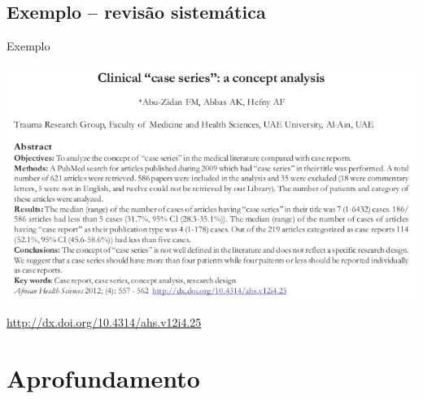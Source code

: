 \documentclass{beamer}
\begin{document}

\subsection{Exemplo -- revisão sistemática}

\begin{frame}{Exemplo}
  \begin{exampleblock}{}
    \begin{center}
      \includegraphics[width=\textwidth]{Metodos/case-series}

      \bigskip
      \tiny \url{http://dx.doi.org/10.4314/ahs.v12i4.25}
    \end{center}
  \end{exampleblock}
\end{frame}

\section{Aprofundamento}
\end{document}
